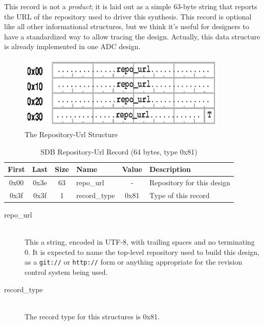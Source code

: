 \documentclass[a4paper, 12pt]{article}
\begin{document}
This record is not a \textit{product}; it is laid out as a simple 63-byte string
that reports the URL of the repository used to driver this synthesis.
This record is optional like all other informational structures, but we think it's
useful for designers to have a standardized way to allow tracing the design.
Actually, this data structure is already implemented in one ADC design.

\begin{figure}[h]
\centering%
\includegraphics[width=100mm]{img/sdb-url.ps}
\caption{The Repository-Url Structure}
\label{fig:FigureUrl}
\end{figure}

\begin{center}
  \begin{savenotes}
    \begin{table}[!ht]\footnotesize
      \caption{SDB Repository-Url Record (64 bytes, type 0x81)}\label{sdb_url}\centering
        \begin{tabular}{| c | c | c | l | c | p{5cm} |} \hline
        First & Last & Size & Name & Value & Description \\ \hline
        0x00 & 0x3e & 63 & repo\_url & - & Repository for this design \\ \hline
        0x3f & 0x3f & 1 & record\_type & 0x81 & Type of this record \\ \hline
        \end{tabular}
    \end{table}
  \end{savenotes}
\end{center}

\begin{description}
\item[repo\_url] \hfill \\
This a string, encoded in  UTF-8, with trailing spaces and no terminating 0.
It is expected to name the top-level repository
used to build this design, as a \texttt{git://} or \texttt{http://} form or
anything appropriate for the revision control system being used.

\item[record\_type] \hfill \\
The record type for this structures is 0x81.
\end{description}
\end{document}
